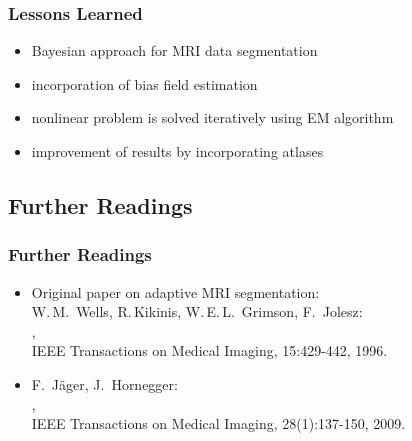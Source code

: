 \begin{frame}
  \frametitle{Lessons Learned}
 
  \begin{itemize}
    \item Bayesian approach for MRI data segmentation \\[.25cm]
    \item incorporation of bias field estimation \\[.25cm]
    \item nonlinear problem is solved iteratively using EM algorithm \\[.25cm]
    \item improvement of results by incorporating atlases
  \end{itemize}
\end{frame}



\subsection{Further Readings}

\begin{frame}
  \frametitle{Further Readings}
 
  \begin{itemize}
    \item Original paper on adaptive MRI segmentation: \\[.15cm]
      W.\,M.\ Wells, R.\,Kikinis, W.\,E.\,L.\ Grimson, F.\ Jolesz: \\
      , \\
      IEEE Transactions on Medical Imaging, 15:429-442, 1996. \\[.3cm]
    \item F.\ J{\"a}ger, J.\ Hornegger: \\
      , \\
      IEEE Transactions on Medical Imaging, 28(1):137-150, 2009.
  \end{itemize}
\end{frame}


